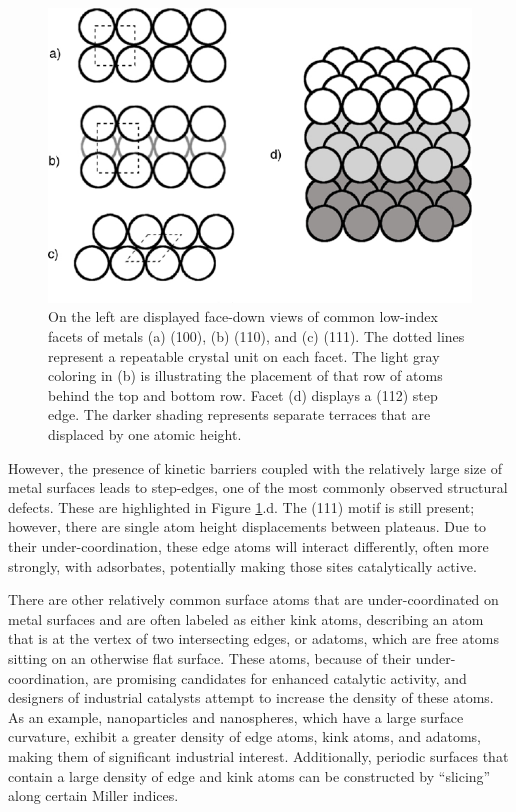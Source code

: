 \begin{figure}[p!]
  \centering
  \includegraphics[width=\linewidth]{../figures/chap1/facets.pdf}
  \caption{On the left are displayed face-down views of common low-index facets
of metals (a) (100), (b) (110), and (c) (111). The dotted lines represent a
repeatable crystal unit on each facet. The light gray coloring in (b) is
illustrating the placement of that row of atoms behind the top and bottom row.
Facet (d) displays a (112) step edge. The darker shading represents separate
terraces that are displaced by one atomic height.}
\label{fig:facets}
\end{figure}

However, the presence of kinetic barriers coupled with the relatively large
size of metal surfaces leads to step-edges, one of the most commonly observed
structural defects.  These are highlighted in Figure \ref{fig:facets}.d.  The
(111) motif is still present; however, there are single atom height
displacements between plateaus. Due to their under-coordination, these edge
atoms will interact differently, often more strongly, with adsorbates,
potentially making those sites catalytically active.

There are other relatively common surface atoms that are under-coordinated on
metal surfaces and are often labeled as either kink atoms, describing an atom
that is at the vertex of two intersecting edges, or adatoms, which are free
atoms sitting on an otherwise flat surface. These atoms, because of their
under-coordination, are promising candidates for enhanced catalytic activity,
and designers of industrial catalysts attempt to increase the density of these
atoms.  As an example, nanoparticles and nanospheres, which have a large surface curvature, 
exhibit a greater density of edge atoms, kink atoms, and adatoms, making them
of significant industrial interest.  Additionally, periodic surfaces that contain a large
density of edge and kink atoms can be constructed by ``slicing'' along certain
Miller indices.

